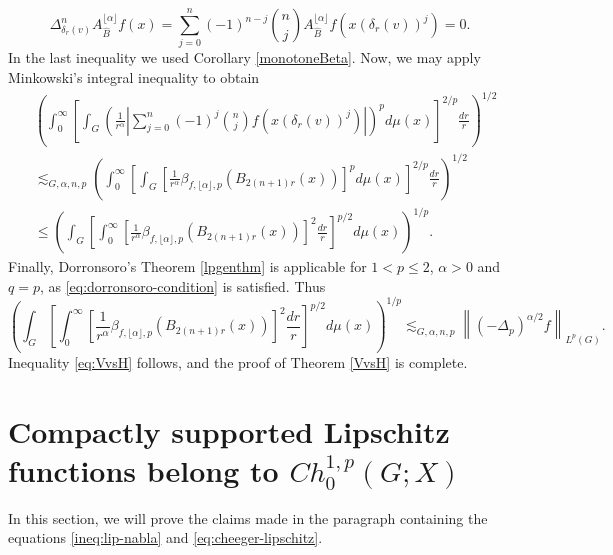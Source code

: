 \documentclass[11pt,reqno]{amsart}
\newcommand{\1}{\mathbf 1}
\begin{document}
\[
\Delta_{\delta_r\left(v\right)}^n A^{\lfloor\alpha\rfloor}_{\hat{B}}f\left(x\right)=\sum_{j=0}^n \left(-1\right)^{n-j} \binom{n}{j}A^{\lfloor\alpha\rfloor}_{\hat{B}}f\left(x\left(\delta_{r}\left(v\right)\right)^j\right)=0.
\]
In the last inequality we used Corollary \ref{monotoneBeta}. Now, we may apply Minkowski's integral inequality to obtain
\begin{align*}
& \left(\int_0^\infty \left[ \int_G \left(\frac{1}{r^\alpha}\left|\sum_{j=0}^n \left(-1\right)^j \binom{n}{j}f\left(x\left(\delta_{r}\left(v\right)\right)^j\right)\right| \right)^p d\mu\left(x\right) \right]^{2/p}  \frac{dr}{r} \right)^{1/2}\\
& \lesssim_{G,\alpha,n,p} \left(\int_0^\infty \left[ \int_G \left[\frac{1}{r^\alpha}\beta_{f,\lfloor\alpha\rfloor, p}\left(B_{2\left(n+1\right)r}\left(x\right)\right)\right]^p  d\mu\left(x\right) \right]^{2/p}  \frac{dr}{r} \right)^{1/2}\\
& \le \left( \int_G \left[ \int_0^\infty \left[\frac{1}{r^\alpha} \beta_{f,\lfloor\alpha\rfloor,p}\left(B_{2\left(n+1\right)r}\left(x\right)\right)\right]^2  \frac{dr}{r} \right]^{p/2}  d\mu\left(x\right) \right)^{1/p}.
\end{align*}
Finally, Dorronsoro's Theorem \ref{lpgenthm} is applicable for $1<p\le 2$, $\alpha>0$ and $q=p$, as \eqref{eq:dorronsoro-condition} is satisfied. Thus
\[
\left( \int_G \left[ \int_0^\infty \left[\frac{1}{r^\alpha} \beta_{f,\lfloor\alpha\rfloor,p}\left(B_{2\left(n+1\right)r}\left(x\right)\right)\right]^2  \frac{dr}{r} \right]^{p/2}  d\mu\left(x\right) \right)^{1/p}\lesssim_{G,\alpha,n,p} \left\|\left(-\Delta_p\right)^{\alpha/2} f\right\|_{L^p\left(G\right)}.
\]
Inequality \eqref{eq:VvsH} follows, and the proof of Theorem \ref{VvsH} is complete.












\appendix

\section{Compactly supported Lipschitz functions belong to $Ch_0^{1,p}\left(G;X\right)$}\label{app:lipnabla}
In this section, we will prove the claims made in the paragraph containing the equations \eqref{ineq:lip-nabla} and \eqref{eq:cheeger-lipschitz}.
\end{document}
